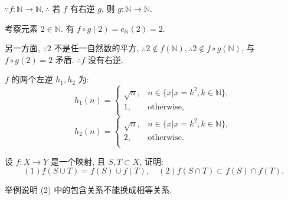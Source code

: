 \documentclass{ctexart}
\begin{document}
\begin{solution}
    $\because f:\mathbb{N}\to\mathbb{N},\therefore$ 若 $f$ 有右逆 $g$, 则 $g:\mathbb{N}\to\mathbb{N}$.

    考察元素 $2\in\mathbb{N}$. 有 $f\circ g(2)=e_{\mathbb{N}}(2)=2$.

    另一方面, $\because 2$ 不是任一自然数的平方, $\therefore2\notin f(\mathbb{N}),\therefore2\notin f\circ g(\mathbb{N})$, 与 $f\circ g(2)=2$ 矛盾. $\therefore f$ 没有右逆.

    $f$ 的两个左逆 $h_1,h_2$ 为:
    \[h_1(n)=\begin{cases}
        \sqrt{n}, & n\in\{x|x=k^2,k\in\mathbb{N}\}, \\
        1, & \text{otherwise}, \\
    \end{cases}\]
    \[h_2(n)=\begin{cases}
        \sqrt{n}, & n\in\{x|x=k^2,k\in\mathbb{N}\}, \\
        2, & \text{otherwise}. \\
    \end{cases}\]
\end{solution}
\begin{exercise}%
    设 $f:X\to Y$ 是一个映射, 且 $S,T\subset X$, 证明:
    \[(1)f(S\cup T)=f(S)\cup f(T),\quad(2)f(S\cap T)\subset f(S)\cap f(T).\]

    举例说明 (2) 中的包含关系不能换成相等关系.
\end{exercise}
\end{document}
